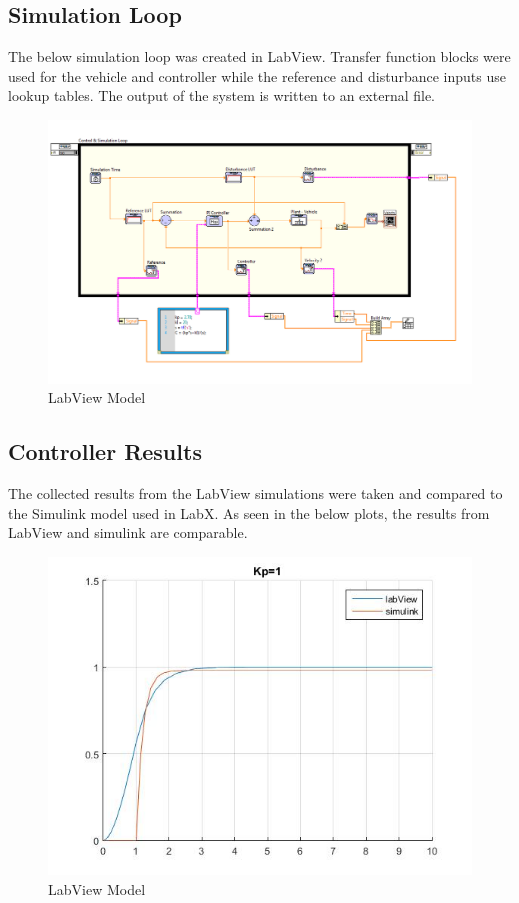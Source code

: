 \documentclass[11pt,titlepage]{article}
\begin{document}
	\subsection{Simulation Loop}
		The below simulation loop was created in LabView. Transfer function blocks were used for the vehicle and controller while the reference and disturbance inputs use lookup tables. The output of the system is written to an external file.
		\begin{figure}[H]
			\centering
			\includegraphics[scale=.5]{labviewIntro}
			\caption{LabView Model}
		\end{figure}
	\subsection{Controller Results}
		The collected results from the LabView simulations were taken and compared to the Simulink model used in LabX. As seen in the below plots, the results from LabView and simulink are comparable.
		\begin{figure}[H]
			\centering
			\includegraphics[scale=.5]{Kp1}
			\caption{LabView Model}
		\end{figure}	
\end{document}

